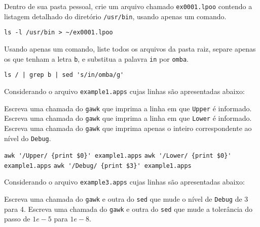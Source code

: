 \begin{Exercise}[label={0001},difficulty={0},origin={bash}]
  Dentro de sua pasta pessoal, crie um arquivo chamado \lstinline+ex0001.lpoo+
  contendo a listagem detalhado do diretório \lstinline+/usr/bin+, usando apenas um
  comando. 
\end{Exercise}

\begin{Answer}[ref={0001}]
\begin{lstlisting}
ls -l /usr/bin > ~/ex0001.lpoo
\end{lstlisting}
\end{Answer}

\begin{Exercise}[label={0002},difficulty={2},origin={bash}]
  Usando apenas um comando, liste todos os arquivos da pasta raiz, separe apenas
  os que tenham a letra \lstinline+b+, e substitua a palavra \lstinline+in+ por
  \lstinline+omba+.
\end{Exercise}

\begin{Answer}[ref={0002}]
\begin{lstlisting}
ls / | grep b | sed 's/in/omba/g'
\end{lstlisting}
\end{Answer}

\begin{Exercise}[label={0003}, difficulty={1}, origin={gawk}]
  Considerando o arquivo \lstinline+example1.apps+ cujas linhas são
  apresentadas abaixo:
  
    \Question Escreva uma chamada do \lstinline+gawk+ que imprima a linha em que
      \lstinline+Upper+ é informado.
    \Question Escreva uma chamada do \lstinline+gawk+ que imprima a linha em que
      \lstinline+Lower+ é informado.
    \Question Escreva uma chamada do \lstinline+gawk+ que imprima apenas o inteiro
      correspondente ao nível do \lstinline+Debug+.
\end{Exercise}

\begin{Answer}[ref={0003}]
  \Question \lstinline+awk '/Upper/ {print $0}' example1.apps+
  \Question \lstinline+awk '/Lower/ {print $0}' example1.apps+
  \Question \lstinline+awk '/Debug/ {print $3}' example1.apps+
\end{Answer}

\begin{Exercise}[label={0004}, difficulty={1}, origin={gawk}]
  Considerando o arquivo \lstinline+example3.apps+ cujas linhas são
  apresentadas abaixo:
  
    \Question Escreva uma chamada do \lstinline+gawk+ e outra do \lstinline+sed+ que
      mude o nível de \lstinline+Debug+ de 3 para 4.
    \Question Escreva uma chamada do \lstinline+gawk+ e outra do \lstinline+sed+ que
      mude a tolerância do passo de $1e-5$ para $1e-8$.
\end{Exercise}

